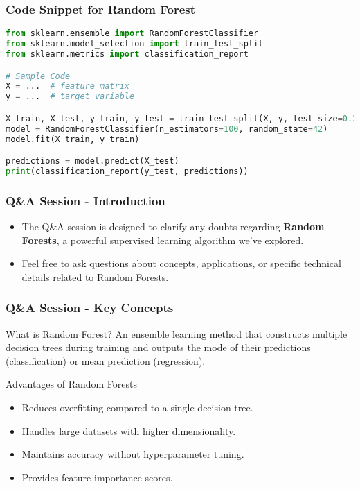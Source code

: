 \documentclass[aspectratio=169]{beamer}
\begin{document}
\begin{frame}[fragile]
    \frametitle{Code Snippet for Random Forest}
    \begin{lstlisting}[language=python]
from sklearn.ensemble import RandomForestClassifier
from sklearn.model_selection import train_test_split
from sklearn.metrics import classification_report

# Sample Code
X = ...  # feature matrix
y = ...  # target variable

X_train, X_test, y_train, y_test = train_test_split(X, y, test_size=0.2, random_state=42)
model = RandomForestClassifier(n_estimators=100, random_state=42)
model.fit(X_train, y_train)

predictions = model.predict(X_test)
print(classification_report(y_test, predictions))
    \end{lstlisting}
\end{frame}

\begin{frame}[fragile]
    \frametitle{Q\&A Session - Introduction}
    \begin{itemize}
        \item The Q\&A session is designed to clarify any doubts regarding \textbf{Random Forests}, a powerful supervised learning algorithm we've explored.
        \item Feel free to ask questions about concepts, applications, or specific technical details related to Random Forests.
    \end{itemize}
\end{frame}

\begin{frame}[fragile]
    \frametitle{Q\&A Session - Key Concepts}
    \begin{block}{What is Random Forest?}
        An ensemble learning method that constructs multiple decision trees during training and outputs the mode of their predictions (classification) or mean prediction (regression).
    \end{block}
    
    \begin{block}{Advantages of Random Forests}
        \begin{itemize}
            \item Reduces overfitting compared to a single decision tree.
            \item Handles large datasets with higher dimensionality.
            \item Maintains accuracy without hyperparameter tuning.
            \item Provides feature importance scores.
        \end{itemize}
    \end{block}
\end{frame}
\end{document}
